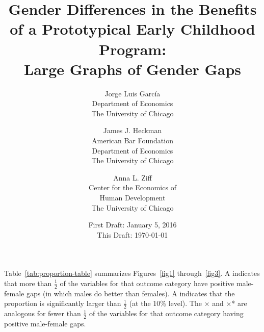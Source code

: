 


\usepackage[stable]{footmisc}

\newcommand*\leftright[2]{%
  \leavevmode
  \rlap{#1}%
  \hspace{0.5\linewidth}%
  #2}

\newcommand{\orth}{\ensuremath{\perp\!\!\!\perp}}%
\newcommand{\indep}{\orth}%
\newcommand{\notorth}{\ensuremath{\perp\!\!\!\!\!\!\diagup\!\!\!\!\!\!\perp}}%
\newcommand{\notindep}{\notorth}




\begin{titlepage}

\title{\Large \textbf{Gender Differences in the Benefits of a Prototypical Early Childhood Program: \\ Large Graphs of Gender Gaps}}

\author{
Jorge Luis Garc\'{i}a\\
Department of Economics\\
The University of Chicago \and
James J. Heckman \\
American Bar Foundation \\
Department of Economics\\
The University of Chicago \and
Anna L. Ziff \\
Center for the Economics of \\
Human Development \\
The University of Chicago}
\date{First Draft: January 5, 2016\\ This Draft: \today}

\maketitle
\restoregeometry
\end{titlepage}

Table~\ref{tab:proportion-table} summarizes Figures~\ref{fig1} through~\ref{fig3}. A \checkmark indicates that more than $\frac{1}{2}$ of the variables for that outcome category have positive male-female gaps (in which males do better than females). A \checkmark* indicates that the proportion is significantly larger than $\frac{1}{2}$ (at the 10\% level). The $\times$ and $\times$* are analogous for fewer than $\frac{1}{2}$ of the variables for that outcome category having positive male-female gaps. 

